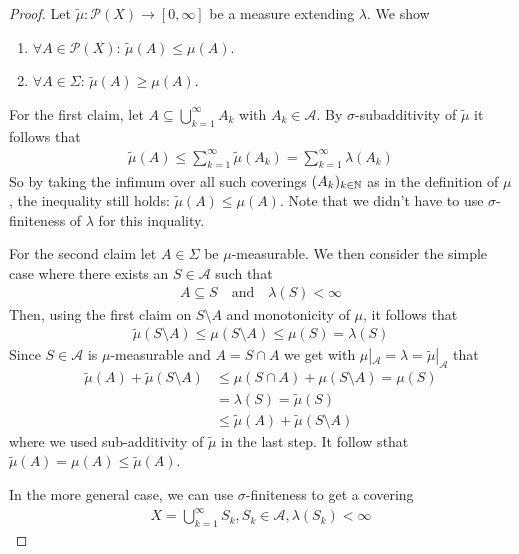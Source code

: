 \begin{proof}
  Let $\tilde{\mu}: \mathcal{P}(X) \to [0,\infty]$ be a measure extending $\lambda$.
  We show
  \begin{enumerate}[{(}i{)}]
    \item $\forall A \in \mathcal{P}(X)$: $\tilde{\mu}(A) \leq \mu(A)$.
    \item $\forall A \in \Sigma$: $\tilde{\mu}(A) \geq \mu(A)$.
  \end{enumerate}
  For the first claim, let $A \subseteq \bigcup_{k=1}^{\infty}A_k$ with $A_k \in \mathcal{A}$.
  By $\sigma$-subadditivity of $\tilde{\mu}$ it follows that
  \begin{align*}
    \tilde{\mu}(A) \leq \sum_{k=1}^{\infty}\tilde{\mu}(A_k) = \sum_{k=1}^{\infty}\lambda(A_k)
  \end{align*}
  So by taking the infimum over all such coverings $(A_k)_{k \in \mathbb{N}}$ as in the definition of $\mu$, the inequality still holds: $\tilde{\mu}(A) \leq \mu(A)$.
  Note that we didn't have to use $\sigma$-finiteness of $\lambda$ for this inquality.

  For the second claim let $A \in \Sigma$ be $\mu$-measurable. 
  We then consider the simple case where there exists an $S \in \mathcal{A}$ such that
  \begin{align*}
    A \subseteq S \quad \text{and} \quad \lambda(S) < \infty
  \end{align*}
  Then, using the first claim on $S \setminus A$ and monotonicity of $\mu$, it follows that
  \begin{align*}
    \tilde{\mu}(S \setminus A) \leq \mu(S \setminus A) \leq \mu(S) = \lambda(S)
  \end{align*}
    Since $S \in \mathcal{A}$ is $\mu$-measurable and $A = S \cap A$ we get with $\mu|_{\mathcal{A}} = \lambda = \tilde{\mu}|_{\mathcal{A}}$ that 
  \begin{align*}
    \tilde{\mu}(A) + \tilde{\mu}(S \setminus A) 
    &\leq
    \mu(S \cap A) + \mu(S \setminus A) = \mu(S)\\
    &=
    \lambda(S) = \tilde{\mu}(S)\\
    &\leq 
    \tilde{\mu}(A) + \tilde{\mu}(S \setminus A)
  \end{align*}
  where we used sub-additivity of $\tilde{\mu}$ in the last step.
  It follow sthat $\tilde{\mu}(A) = \mu(A) \leq \tilde{\mu}(A)$.

  In the more general case, we can use $\sigma$-finiteness to get a covering 
  \begin{align*}
    X = \bigcup_{k=1}^{\infty}S_k, S_k \in \mathcal{A}, \lambda(S_k) < \infty
  \end{align*}


\end{proof}
